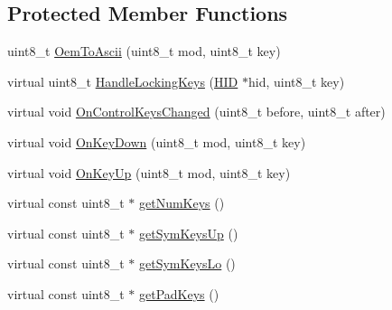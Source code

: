\subsection*{\-Protected \-Member \-Functions}
\begin{DoxyCompactItemize}
\item 
uint8\-\_\-t \hyperlink{class_keyboard_report_parser_aa21e9230ae4c2f068c404a9c2909a1f3}{\-Oem\-To\-Ascii} (uint8\-\_\-t mod, uint8\-\_\-t key)
\item 
virtual uint8\-\_\-t \hyperlink{class_keyboard_report_parser_a486df60a3d29f73e9052d3efb0c38de6}{\-Handle\-Locking\-Keys} (\hyperlink{class_h_i_d}{\-H\-I\-D} $\ast$hid, uint8\-\_\-t key)
\item 
virtual void \hyperlink{class_keyboard_report_parser_ae8ce494271e8536f4bdc089db51bc67e}{\-On\-Control\-Keys\-Changed} (uint8\-\_\-t before, uint8\-\_\-t after)
\item 
virtual void \hyperlink{class_keyboard_report_parser_af855e596bbbb9755535f6e69f4ca2305}{\-On\-Key\-Down} (uint8\-\_\-t mod, uint8\-\_\-t key)
\item 
virtual void \hyperlink{class_keyboard_report_parser_a57710d31e5379db14779f960f5c714b2}{\-On\-Key\-Up} (uint8\-\_\-t mod, uint8\-\_\-t key)
\item 
virtual const uint8\-\_\-t $\ast$ \hyperlink{class_keyboard_report_parser_a963cbe34cb4061dff6262ce4b39a43e2}{get\-Num\-Keys} ()
\item 
virtual const uint8\-\_\-t $\ast$ \hyperlink{class_keyboard_report_parser_a2df76a06fee8df45a3d0850459887427}{get\-Sym\-Keys\-Up} ()
\item 
virtual const uint8\-\_\-t $\ast$ \hyperlink{class_keyboard_report_parser_a14a44500a5c22cb7e5374e4e334e0255}{get\-Sym\-Keys\-Lo} ()
\item 
virtual const uint8\-\_\-t $\ast$ \hyperlink{class_keyboard_report_parser_afa488405e7ba3ce5249064f38bb8912c}{get\-Pad\-Keys} ()
\end{DoxyCompactItemize}
